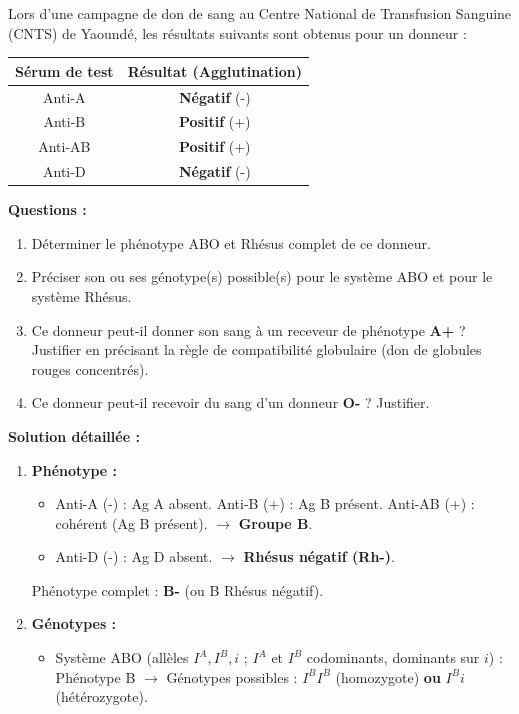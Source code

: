 \documentclass[11pt]{article}
\begin{document}
\begin{exoresolu}
Lors d'une campagne de don de sang au Centre National de Transfusion Sanguine (CNTS) de Yaoundé, les résultats suivants sont obtenus pour un donneur :
\begin{center}
    \begin{tabular}{|c|c|}
        \hline
        \textbf{Sérum de test} & \textbf{Résultat (Agglutination)} \\ \hline
        Anti-A & \textbf{Négatif} (-) \\ \hline
        Anti-B & \textbf{Positif} (+) \\ \hline
        Anti-AB & \textbf{Positif} (+) \\ \hline
        Anti-D & \textbf{Négatif} (-) \\ \hline
    \end{tabular}
\end{center}
\textbf{Questions :}
\begin{enumerate}
    \item Déterminer le phénotype ABO et Rhésus complet de ce donneur.
    \item Préciser son ou ses génotype(s) possible(s) pour le système ABO et pour le système Rhésus.
    \item Ce donneur peut-il donner son sang à un receveur de phénotype \textbf{A+} ? Justifier en précisant la règle de compatibilité globulaire (don de globules rouges concentrés).
    \item Ce donneur peut-il recevoir du sang d'un donneur \textbf{O-} ? Justifier.
\end{enumerate}
\tcblower
\textbf{Solution détaillée :}
\begin{enumerate}
    \item \textbf{Phénotype :} 
    \begin{itemize}
        \item Anti-A (-) : Ag A absent. Anti-B (+) : Ag B présent. Anti-AB (+) : cohérent (Ag B présent). $\rightarrow$ \textbf{Groupe B}.
        \item Anti-D (-) : Ag D absent. $\rightarrow$ \textbf{Rhésus négatif (Rh-)}.
    \end{itemize}
    Phénotype complet : \textbf{B-} (ou B Rhésus négatif).
    \item \textbf{Génotypes :}
    \begin{itemize}
        \item Système ABO (allèles $I^A, I^B, i$ ; $I^A$ et $I^B$ codominants, dominants sur $i$) : Phénotype B $\rightarrow$ Génotypes possibles : \textbf{$I^B I^B$} (homozygote) \textbf{ou} \textbf{$I^B i$} (hétérozygote).

\end{itemize}
\end{enumerate}
\end{exoresolu}
\end{document}
